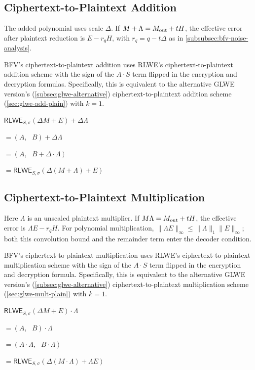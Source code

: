 \subsection{Ciphertext-to-Plaintext Addition}
\label{subsec:bfv-add-plain}

The added polynomial uses scale $\Delta$. If $M+\Lambda=M_{\rm out}+tH$, the effective error after plaintext reduction is $E-r_qH$, with $r_q=q-t\Delta$ as in \autoref{subsubsec:bfv-noise-analysis}.

BFV's ciphertext-to-plaintext addition uses RLWE's ciphertext-to-plaintext addition scheme with the sign of the $A\cdot S$ term flipped in the encryption and decryption formulas. Specifically, this is equivalent to the alternative GLWE version's (\autoref{subsec:glwe-alternative}) ciphertext-to-plaintext addition scheme (\autoref{sec:glwe-add-plain}) with $k = 1$.  


\begin{tcolorbox}[title={\textbf{\tboxlabel{\ref*{subsec:bfv-add-plain}} BFV Ciphertext-to-Plaintext Addition}}]
$\textsf{RLWE}_{S, \sigma}(\Delta M + E) + \Delta\Lambda $

$=  (A, \text{ } B) + \Delta\Lambda$

$=  (A, \text{ } B + \Delta\cdot\Lambda)$

$= \textsf{RLWE}_{S, \sigma}(\Delta (M + \Lambda) + E)$
\end{tcolorbox}



\subsection{Ciphertext-to-Plaintext Multiplication}
\label{subsec:bfv-mult-plain}

Here $\Lambda$ is an unscaled plaintext multiplier. If $M\Lambda=M_{\rm out}+tH$, the effective error is $\Lambda E-r_qH$. For polynomial multiplication, $\|\Lambda E\|_\infty\leq\|\Lambda\|_1\|E\|_\infty$; both this convolution bound and the remainder term enter the decoder condition.


BFV's ciphertext-to-plaintext multiplication uses RLWE's ciphertext-to-plaintext multiplication scheme with the sign of the $A\cdot S$ term flipped in the encryption and decryption formula. Specifically, this is equivalent to the alternative GLWE version's (\autoref{subsec:glwe-alternative}) ciphertext-to-plaintext multiplication scheme (\autoref{sec:glwe-mult-plain}) with $k = 1$.   


\begin{tcolorbox}[title={\textbf{\tboxlabel{\ref*{subsec:bfv-mult-plain}} BFV Ciphertext-to-Plaintext Multiplication}}]
$\textsf{RLWE}_{S, \sigma}(\Delta M + E) \cdot \Lambda$

$= (A, \text{ } B) \cdot \Lambda$

$= (A \cdot \Lambda, \text{ }  B \cdot \Lambda )$

$= \textsf{RLWE}_{S, \sigma}(\Delta (M \cdot \Lambda) + \Lambda E)$
\end{tcolorbox}





